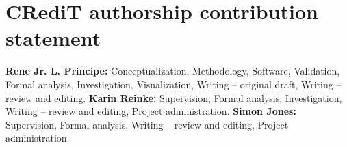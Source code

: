 \documentclass[]{interact}
\theoremstyle{plain}%
\theoremstyle{definition}
\theoremstyle{remark}
\begin{document}
    \section*{CRediT authorship contribution statement}
    
    \textbf{Rene Jr. L. Principe:} Conceptualization, Methodology, Software, Validation, Formal analysis, Investigation, Visualization, Writing -- original draft, Writing -- review and editing. \textbf{Karin Reinke:} Supervision, Formal analysis, Investigation, Writing -- review and editing, Project administration. \textbf{Simon Jones:} Supervision, Formal analysis, Writing -- review and editing, Project administration.




\end{document}
